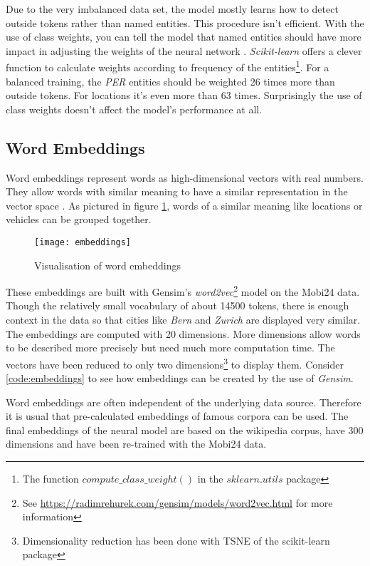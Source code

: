 Due to the very imbalanced data set, the model mostly learns how to detect outside tokens rather than named entities. This procedure isn't efficient. With the use of class weights, you can tell the model that named entities should have more impact in adjusting the weights of the neural network \cite{imb18}. \emph{Scikit-learn} offers a clever function to calculate weights according to frequency of the entities\footnote{The function $compute\_class\_weight()$ in the $sklearn.utils$ package}. For a balanced training, the \emph{PER} entities should be weighted 26 times more than outside tokens. For locations it's even more than 63 times. Surprisingly the use of class weights doesn't affect the model's performance at all.

\subsection{Word Embeddings}
\label{chap:embd}

Word embeddings represent words as high-dimensional vectors with real numbers. They allow words with similar meaning to have a similar representation in the vector space \cite{emb18}. As pictured in figure \ref{fig:embeddings}, words of a similar meaning like locations or vehicles can be grouped together.

\begin{figure}[!ht]
    \centering
    \texttt{[image: embeddings]}
    \caption{Visualisation of word embeddings}
    \label{fig:embeddings}
\end{figure}

These embeddings are built with Gensim's \emph{word2vec}\footnote{See \url{https://radimrehurek.com/gensim/models/word2vec.html} for more information} model on the Mobi24 data. Though the relatively small vocabulary of about 14500 tokens, there is enough context in the data so that cities like \emph{Bern} and \emph{Zurich} are displayed very similar. The embeddings are computed with 20 dimensions. More dimensions allow words to be described more precisely but need much more computation time. The vectors have been reduced to only two dimensions\footnote{Dimensionality reduction has been done with TSNE of the scikit-learn package} to display them. Consider \ref{code:embeddings} to see how embeddings can be created by the use of \emph{Gensim}.

Word embeddings are often independent of the underlying data source. Therefore it is usual that pre-calculated embeddings of famous corpora can be used. The final embeddings of the neural model are based on the wikipedia corpus, have 300 dimensions and have been re-trained with the Mobi24 data.

